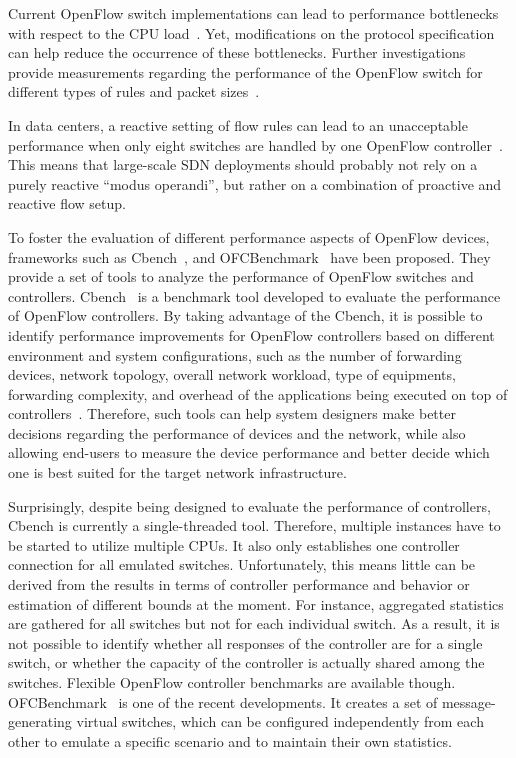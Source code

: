 Current OpenFlow switch implementations can lead to performance bottlenecks with respect to the CPU 
load~\cite{curtis2011}. Yet, modifications on the protocol specification can help reduce the occurrence 
of these bottlenecks. Further investigations provide measurements regarding the performance of the OpenFlow switch for different types of rules and packet sizes~\cite{bianco2010}.

In data centers, a reactive setting of flow rules can lead to an unacceptable performance when only eight 
switches are handled by one OpenFlow controller~\cite{pries2012}. This means that large-scale SDN deployments should probably not rely on a purely reactive ``modus operandi'', but rather on a combination of proactive and reactive flow setup.

To foster the evaluation of different performance aspects of OpenFlow devices, frameworks such as 
 Cbench~\cite{tootoonchian2012}, and OFCBenchmark~\cite{jarschel2012} have been proposed. They provide a set of tools to analyze the performance of OpenFlow switches and controllers.
Cbench~\cite{tootoonchian2012,sherwood2011} is a benchmark tool developed to evaluate the performance of OpenFlow controllers. By taking advantage of the Cbench, it is possible to identify performance improvements for OpenFlow controllers based on different environment and system configurations, such as the number of forwarding devices, network topology, overall network workload, type of equipments, forwarding complexity, and overhead of the applications being executed on top of controllers~\cite{tootoonchian2012}.
Therefore, such tools can help system designers make better decisions regarding the performance of devices and the network, while also allowing end-users to measure the device performance and better decide which one is best suited for the target network infrastructure.

Surprisingly, despite being designed to evaluate the performance of controllers, Cbench is currently a single-threaded tool. Therefore, multiple instances have to be started to utilize multiple CPUs. It also only establishes one controller connection for all emulated switches. Unfortunately, this means little can be derived from the results in terms 
of controller performance and behavior or estimation of different bounds at the moment. For instance, aggregated statistics are gathered for all switches but not for each individual switch. As a result, it is not possible to identify whether all responses of the controller are for a single switch, or whether the capacity of the controller is actually shared among the switches. Flexible OpenFlow controller benchmarks are available though. 
OFCBenchmark~\cite{jarschel2012} is one of the recent developments. It creates a set of message-generating virtual switches, which can be configured independently from each other to emulate a specific scenario and to maintain their own statistics.

